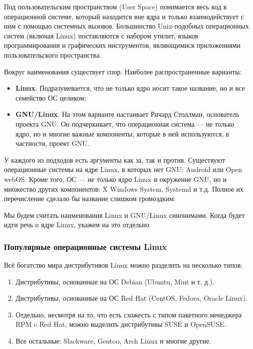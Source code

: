 \documentclass[14pt, a4paper]{article}
\begin{document}
Под пользовательским пространством (User Space) понимается весь код в операционной
системе, который находится вне ядра и только взаимодействует с ним с помощью системных вызовов.
Большинство Unix-подобных операционных систем (включая Linux) поставляются с набором утилит,
языков программирования и графических инструментов, являющимися приложениями
пользовательского пространства.

Вокруг наименования существует спор. Наиболее распространенные варианты:

\begin{itemize}
    \item \textbf{Linux}. Подразумевается, что не только ядро носит такое название, но и все семейство ОС
    целиком;
    \item \textbf{GNU/Linux}. На этом варианте настаивает Ричард Столлман, основатель проекта GNU. Он
    подчеркивает, что операционная система — не только ядро, но и многие важные компоненты,
    которые в ней используются, в частности, проект GNU.
\end{itemize}
У каждого из подходов есть аргументы как за, так и против. Существуют операционные
системы на ядре Linux, в которых нет GNU: Android или Open webOS. Кроме того, ОС — не только
ядро Linux и окружение GNU, но и множество других компонентов: X Windows System, Systemd и т.д.
Полное их перечисление сделало бы название слишком громоздким.

Мы будем считать наименования Linux и GNU/Linux синонимами. Когда будет идти речь о ядре
Linux, укажем на это отдельно.\\


\subsubsection*{Популярные операционные системы Linux}

Всё богатство мира дистрибутивов Linux можно разделить на несколько типов:

\begin{enumerate}
    \item Дистрибутивы, основанные на ОС Debian (Ubuntu, Mint и т. д.).
    \item Дистрибутивы, основанные на ОС Red Hat (CentOS, Fedora, Oracle Linux).
    \item Отдельно, несмотря на то, что есть схожесть с типом пакетного менеджера RPM c Red Hat,
    можно выделить дистрибутивы SUSE и OpenSUSE.
    \item Все остальные: Slackware, Gentoo, Arch Linux и многие другие.
\end{enumerate}
\end{document}
